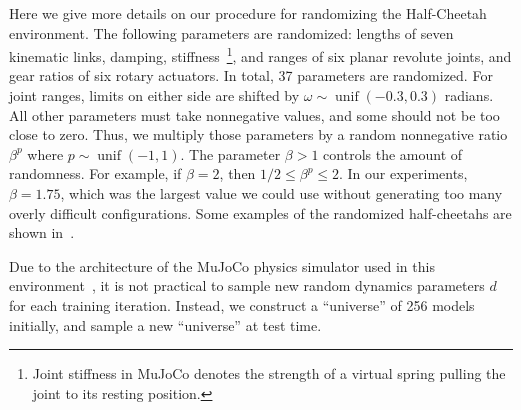 \documentclass{article}
\DeclareMathOperator{\unif}{unif}
\newcommand{\idvar}{d}
\begin{document}
Here we give more details on our procedure for randomizing the Half-Cheetah environment.
The following parameters are randomized:
lengths of seven kinematic links,
damping, stiffness~\footnote{Joint stiffness in MuJoCo denotes the strength of a virtual spring pulling the joint to its resting position.}, and ranges of six planar revolute joints,
and gear ratios of six rotary actuators.
In total, 37 parameters are randomized.
For joint ranges, limits on either side are shifted by $\omega \sim \unif(-0.3, 0.3)$ radians.
All other parameters must take nonnegative values, and some should not be too close to zero.
Thus, we multiply those parameters by a random nonnegative ratio $\beta^p$ where $p \sim \unif(-1, 1)$.
The parameter $\beta > 1$ controls the amount of randomness.
For example, if $\beta = 2$, then $ 1/2 \leq \beta^p \leq 2$.
In our experiments, $\beta = 1.75$, which was the largest value we could use without generating too many overly difficult configurations.
Some examples of the randomized half-cheetahs are shown in~.

Due to the architecture of the MuJoCo physics simulator used in this environment~\citep{todorov-mujoco},
it is not practical to sample new random dynamics parameters $\idvar$ for each training iteration.
Instead, we construct a ``universe'' of 256 models initially, and sample a new ``universe'' at test time.
\end{document}
